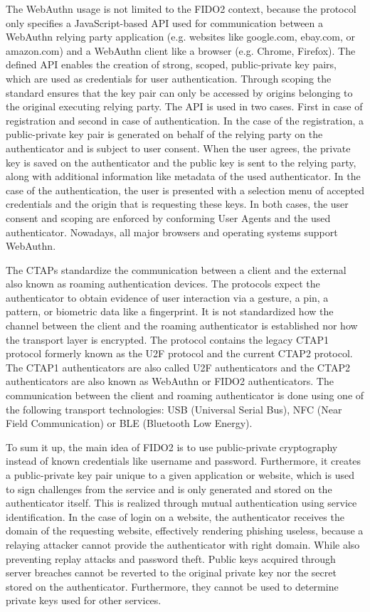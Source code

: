 \documentclass[runningheads]{llncs}
\begin{document}
The WebAuthn usage is not limited to the FIDO2 context, because the protocol only specifies a JavaScript-based API used for communication between a WebAuthn relying party application (e.g. websites like google.com, ebay.com, or amazon.com) and a WebAuthn client like a browser (e.g. Chrome, Firefox). The defined API enables the creation of strong, scoped, public-private key pairs, which are used as credentials for user authentication. Through scoping the standard ensures that the key pair can only be accessed by origins belonging to the original executing relying party. The API is used in two cases. First in case of registration and second in case of authentication. In the case of the registration, a public-private key pair is generated  on behalf of the relying party on the authenticator and is subject to user consent. When the user agrees, the private key is saved on the authenticator and the public key is sent to the relying party, along with additional information like metadata of the used authenticator. In the case of the authentication, the user is presented with a selection menu of accepted credentials and the origin that is requesting these keys. In both cases, the user consent and scoping are enforced by conforming User Agents and the used authenticator.\cite{000002} Nowadays, all major browsers and operating systems support WebAuthn.\cite{000001}

The CTAPs standardize the communication between a client and the external also known as roaming authentication devices. The protocols expect the authenticator to obtain evidence of user interaction via a gesture, a pin, a pattern, or biometric data like a fingerprint. It is not standardized how the channel between the client and the roaming authenticator is established nor how the transport layer is encrypted. The protocol contains the legacy CTAP1 protocol formerly known as the U2F protocol and the current CTAP2 protocol. The CTAP1 authenticators are also called U2F authenticators and the CTAP2 authenticators are also known as WebAuthn or FIDO2 authenticators. The communication between the client and roaming authenticator is done using one of the following transport technologies: USB (Universal Serial Bus), NFC (Near Field Communication) or BLE (Bluetooth Low Energy). \cite{000003}\cite{274547}\cite{9099190}

To sum it up, the main idea of FIDO2 is to use public-private cryptography instead of known credentials like username and password. Furthermore, it creates a public-private key pair unique to a given application or website, which is used to sign challenges from the service and is only generated and stored on the authenticator itself. This is realized through mutual authentication using service identification. In the case of login on a website, the authenticator receives the domain of the requesting website, effectively rendering phishing useless, because a relaying attacker cannot provide the authenticator with right domain.\cite{274610} While also preventing replay attacks and password theft. Public keys acquired through server breaches cannot be reverted to the original private key nor the secret stored on the authenticator. Furthermore, they cannot be used to determine private keys used for other services.
\end{document}
